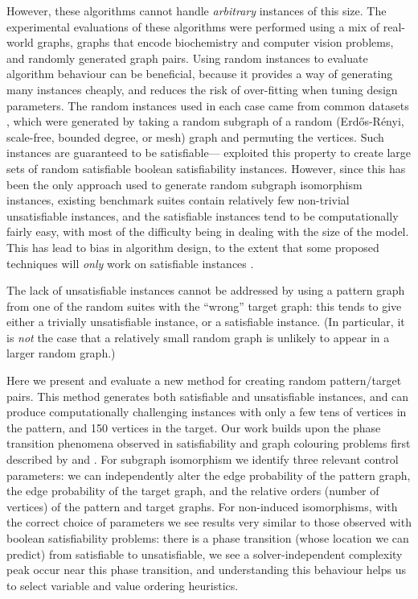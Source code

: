 \documentclass[letterpaper]{article}
\newcommand{\citet}[1]{\citeauthor{#1} \shortcite{#1}}
\newcommand{\citep}[1]{\cite{#1}}
\begin{document}
However, these algorithms cannot handle \emph{arbitrary} instances of this size. The experimental
evaluations of these algorithms were performed using a mix of real-world graphs, graphs that encode
biochemistry and computer vision problems, and randomly generated graph pairs. Using random
instances to evaluate algorithm behaviour can be beneficial, because it provides a way of generating
many instances cheaply, and reduces the risk of over-fitting when tuning design parameters. The
random instances used in each case came from common datasets \citep{DeSanto:2003,Zampelli:2010},
which were generated by taking a random subgraph of a random (Erd\H{o}s-R\'enyi, scale-free, bounded
degree, or mesh) graph and permuting the vertices. Such instances are guaranteed to be
satisfiable---\citet{Anton:2009} exploited this property to create large sets of random satisfiable
boolean satisfiability instances.  However, since this has been the only approach used to generate
random subgraph isomorphism instances, existing benchmark suites contain relatively few non-trivial
unsatisfiable instances, and the satisfiable instances tend to be computationally fairly easy, with
most of the difficulty being in dealing with the size of the model. This has lead to bias in
algorithm design, to the extent that some proposed techniques will \emph{only} work on satisfiable
instances \citep{Battiti:2007}.

The lack of unsatisfiable instances cannot be addressed by using a pattern graph from one of the
random suites with the ``wrong'' target graph: this tends to give either a trivially unsatisfiable
instance, or a satisfiable instance. (In particular, it is \emph{not} the case that a relatively
small random graph is unlikely to appear in a larger random graph.)

Here we present and evaluate a new method for creating random pattern/target pairs. This method
generates both satisfiable and unsatisfiable instances, and can produce computationally challenging
instances with only a few tens of vertices in the pattern, and 150 vertices in the target. Our work
builds upon the phase transition phenomena observed in satisfiability and graph colouring problems
first described by \citet{DBLP:conf/ijcai/CheesemanKT91} and \citet{Mitchell:1992}.  For subgraph isomorphism we
identify three relevant control parameters: we can independently alter the edge probability of the
pattern graph, the edge probability of the target graph, and the relative orders (number of
vertices) of the pattern and target graphs.  For non-induced isomorphisms, with the correct choice
of parameters we see results very similar to those observed with boolean satisfiability problems:
there is a phase transition (whose location we can predict) from satisfiable to unsatisfiable,
we see a solver-independent complexity peak occur near this phase transition, and understanding this
behaviour helps us to select variable and value ordering heuristics.
\end{document}

